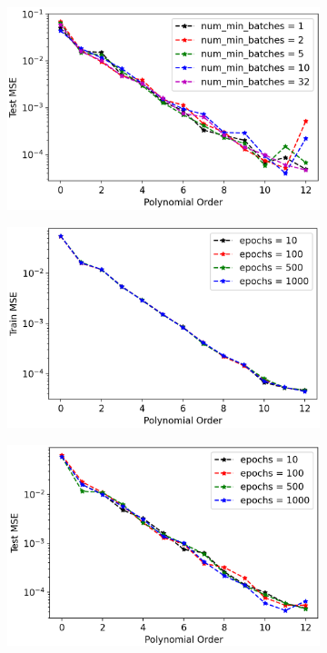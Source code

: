 \begin{figure}[H]
\begin{subfigure}{.49\textwidth}
  \caption{}
  \label{fig:olssgd_train_batch}
\end{subfigure}
\begin{subfigure}{.49\textwidth}
  \centering
  \includegraphics[width=.9\linewidth]{Images/olssgd_test_learn_rate_1_batch_all_epoch_10.png}
  \caption{}
  \label{fig:olssg_test_batch}
\end{subfigure}
\begin{subfigure}{.49\textwidth}
  \centering
  \includegraphics[width=.9\linewidth]{Images/olssgd_train_learn_rate_1_batch_32_epoch_all.png}
  \caption{}
  \label{fig:olssgd_train_epoch}
\end{subfigure}
\begin{subfigure}{.49\textwidth}
  \centering
  \includegraphics[width=.9\linewidth]{Images/olssgd_test_learn_rate_1_batch_32_epoch_all.png}

\end{subfigure}
\end{figure}
